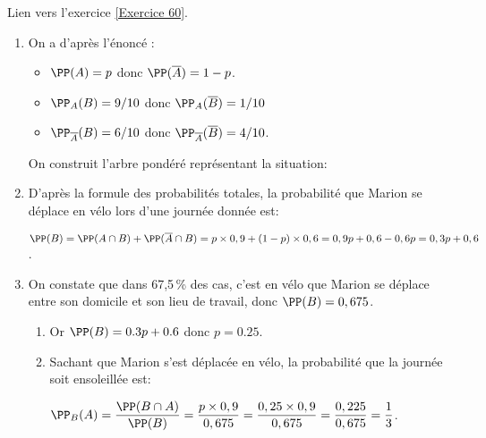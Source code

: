 \documentclass[12pt,fleqn]{report} %
\begin{document}
\begin{correction}Lien vers l'exercice  \ref{Exercice 60}.
	
	\begin{enumerate}
		\item
		On a d'après l'énoncé :\begin{itemize}
			\item $\PP(A) = p$ donc $\PP(\overline{A}) = 1 - p$.
			\item $\PP_A(B) = 9/10$ donc $\PP_A(\overline{B}) = 1/10$
			\item $\PP_{\overline{A}}(B) = 6/10$ donc $\PP_{\overline{A}}(\overline{B}) = 4/10$.
		\end{itemize}
		On construit l'arbre pondéré représentant la situation:
		
		\item D'après la formule des probabilités totales, la probabilité que Marion se déplace en vélo lors d'une journée donnée est:
		
		$\PP(B) =\PP(A\cap B) + \PP(\overline{A}\cap B) = p\times 0,9+ (1-p)\times 0,6 = 0,9p + 0,6 - 0,6p = 0,3p + 0,6$.
		
		\item On constate que dans 67,5\,\% des cas, c'est en vélo que Marion se déplace entre son domicile et son lieu de travail, donc $\PP(B)=0,675$. 
		
		\begin{enumerate}
			\item Or $\PP(B) = 0.3p + 0.6$ donc $p= 0.25$.
			
			\item Sachant que Marion s'est déplacée en vélo, la probabilité que la journée soit ensoleillée est:
			
			$\PP_B(A)= \dfrac{\PP(B\cap A)}{\PP(B)} = \dfrac{p\times 0,9}{0,675} = \dfrac{0,25\times 0,9}{0,675} = \dfrac{0,225}{0,675} = \dfrac{1}{3}$.
		\end{enumerate}
	\end{enumerate}
	
\end{correction}
\end{document}

